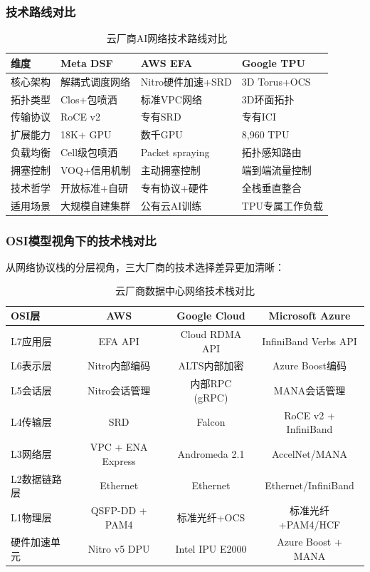 \subsubsection{技术路线对比}

\begin{table}[htbp]
\centering
\caption{云厂商AI网络技术路线对比}
\begin{tabular}{p{2.5cm}p{3.5cm}p{3.5cm}p{3.5cm}}
\toprule
\textbf{维度} & \textbf{Meta DSF} & \textbf{AWS EFA} & \textbf{Google TPU} \\
\midrule
核心架构 & 解耦式调度网络 & Nitro硬件加速+SRD & 3D Torus+OCS \\
拓扑类型 & Clos+包喷洒 & 标准VPC网络 & 3D环面拓扑 \\
传输协议 & RoCE v2 & 专有SRD & 专有ICI \\
扩展能力 & 18K+ GPU & 数千GPU & 8,960 TPU \\
负载均衡 & Cell级包喷洒 & Packet spraying & 拓扑感知路由 \\
拥塞控制 & VOQ+信用机制 & 主动拥塞控制 & 端到端流量控制 \\
技术哲学 & 开放标准+自研 & 专有协议+硬件 & 全栈垂直整合 \\
适用场景 & 大规模自建集群 & 公有云AI训练 & TPU专属工作负载 \\
\bottomrule
\end{tabular}
\end{table}

\subsubsection{OSI模型视角下的技术栈对比}

从网络协议栈的分层视角，三大厂商的技术选择差异更加清晰：

\begin{table}[htbp]
\centering
\caption{云厂商数据中心网络技术栈对比}
\begin{tabular}{lccc}
\toprule
\textbf{OSI层} & \textbf{AWS} & \textbf{Google Cloud} & \textbf{Microsoft Azure} \\
\midrule
L7应用层 & EFA API & Cloud RDMA API & InfiniBand Verbs API \\
L6表示层 & Nitro内部编码 & ALTS内部加密 & Azure Boost编码 \\
L5会话层 & Nitro会话管理 & 内部RPC (gRPC) & MANA会话管理 \\
L4传输层 & SRD & Falcon & RoCE v2 + InfiniBand \\
L3网络层 & VPC + ENA Express & Andromeda 2.1 & AccelNet/MANA \\
L2数据链路层 & Ethernet & Ethernet & Ethernet/InfiniBand \\
L1物理层 & QSFP-DD + PAM4 & 标准光纤+OCS & 标准光纤+PAM4/HCF \\
\midrule
硬件加速单元 & Nitro v5 DPU & Intel IPU E2000 & Azure Boost + MANA \\
\bottomrule
\end{tabular}
\end{table}

